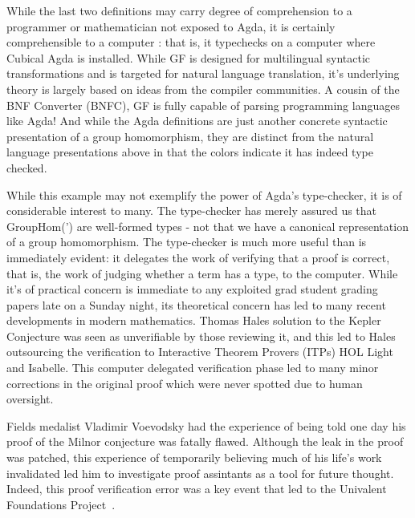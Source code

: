 % 
% 
% 


While the last two definitions may carry degree of comprehension to a programmer or mathematician
not exposed to Agda, it is certainly comprehensible to a computer : that is, it
typechecks on a computer where Cubical Agda is installed. While GF is designed
for multilingual syntactic transformations and is targeted for natural language
translation, it's underlying theory is largely based on ideas from the compiler
communities. A cousin of the BNF Converter (BNFC), GF is fully capable of
parsing programming languages like Agda! And while the Agda definitions are just
another concrete syntactic presentation of a group homomorphism, they are distinct
from the natural language presentations above in that the colors indicate it
has indeed type checked. 

While this example may not exemplify the power of Agda's type-checker, it is of
considerable interest to many. The type-checker has merely assured us that
GroupHom(') are well-formed types - not that we have a canonical representation
of a group homomorphism. The type-checker is much more useful than is
immediately evident: it delegates the work of verifying that a proof is correct,
that is, the work of judging whether a term has a type, to the computer. While
it's of practical concern is immediate to any exploited grad student grading
papers late on a Sunday night, its theoretical concern has led to many recent
developments in modern mathematics. Thomas Hales solution to the Kepler
Conjecture was seen as unverifiable by those reviewing it, and this led to Hales
outsourcing the verification to Interactive Theorem Provers (ITPs) HOL Light and
Isabelle. This computer delegated verification phase led to many minor
corrections in the original proof which were never spotted due to human
oversight.

Fields medalist Vladimir Voevodsky had the experience of being told one day
his proof of the Milnor conjecture was fatally flawed. Although the leak in the
proof was patched, this experience of temporarily believing much of his life's
work invalidated led him to investigate proof assintants as a tool for future
thought. Indeed, this proof verification error was a key event that led to the
Univalent Foundations
Project~\cite{theunivalentfoundationsprogram-homotopytypetheory-2013}.

